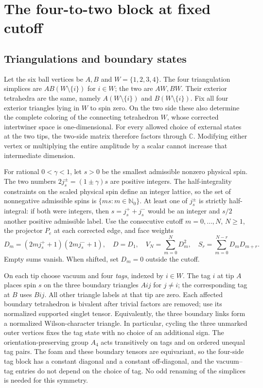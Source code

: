 \documentclass[11pt]{article}
\theoremstyle{remark}
\newcommand{\C}{\mathbb C}
\begin{document}
\section{The four-to-two block at fixed cutoff}\label{sec:pachner}

\subsection{Triangulations and boundary states}

Let the six ball vertices be \(A,B\) and \(W=\{1,2,3,4\}\). The four triangulation simplices are \(AB(W\setminus\{i\})\) for \(i\in W\); the two are \(AW,BW\). Their exterior tetrahedra are the same, namely \(A(W\setminus\{i\})\) and \(B(W\setminus\{i\})\). Fix all four exterior triangles lying in \(W\) to spin zero. On the two side these also determine the complete coloring of the connecting tetrahedron \(W\), whose corrected intertwiner space is one-dimensional. For every allowed choice of external states at the two tips, the two-side matrix therefore factors through \(\C\). Modifying either vertex or multiplying the entire amplitude by a scalar cannot increase that intermediate dimension.

For rational \(0<\gamma<1\), let \(s>0\) be the smallest admissible nonzero physical spin. The two numbers \(2j_s^\pm=(1\pm\gamma)s\) are positive integers. The half-integrality constraints on the scaled physical spin define an integer lattice, so the set of nonnegative admissible spins is \(\{ms:m\in\mathbb{N}_0\}\). At least one of \(j_s^\pm\) is strictly half-integral: if both were integers, then \(s=j_s^++j_s^-\) would be an integer and \(s/2\) another positive admissible label. Use the consecutive cutoff \(m=0,\dots,N\), \(N\geq1\), the projector \(P_e\) at each corrected edge, and face weights
\begin{equation}\label{eq:D}
 D_m=(2m j_s^++1)(2m j_s^-+1),\quad
 D=D_1,\quad
 V_N=\sum_{m=0}^N D_m^2,\quad
 S_r=\sum_{m=0}^{N-r}D_mD_{m+r}.
\end{equation}
Empty sums vanish. When shifted, set \(D_m=0\) outside the cutoff.

On each tip choose vacuum and four \emph{tags}, indexed by \(i\in W\). The tag \(i\) at tip \(A\) places spin \(s\) on the three boundary triangles \(Aij\) for \(j\ne i\); the corresponding tag at \(B\) uses \(Bij\). All other triangle labels at that tip are zero. Each affected boundary tetrahedron is bivalent after trivial factors are removed; use its normalized supported singlet tensor. Equivalently, the three boundary links form a normalized Wilson-character triangle. In particular, cycling the three unmarked outer vertices fixes the tag state with no choice of an additional sign. The orientation-preserving group \(A_4\) acts transitively on tags and on ordered unequal tag pairs. The foam and these boundary tensors are equivariant, so the four-side tag block has a constant diagonal and a constant off-diagonal, and the vacuum--tag entries do not depend on the choice of tag. No odd renaming of the simplices is needed for this symmetry.
\end{document}
